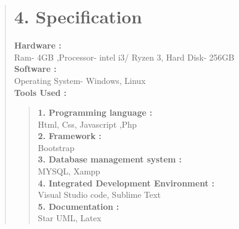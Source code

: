 \documentclass[12pt]{report}
\begin{document}
	
	\begin{quote}
		\section{4. Specification}
		\textbf{Hardware : }\\
		Ram- 4GB ,Processor- intel i3/ Ryzen 3, Hard Disk- 256GB\\
		\vspace{0.3cm}
		\textbf{Software : }\\
		Operating System- Windows, Linux\\
		\vspace{0.3cm}
		\textbf{Tools Used : }\\
		\begin{quote}
			\textbf{1. Programming language :}\\Html, Css, Javascript ,Php\\
			\vspace{0.2cm}
			\textbf{2. Framework :}\\Bootstrap\\
			\vspace{0.2cm}
			\textbf{3. Database management system :}\\MYSQL, Xampp\\
			\vspace{0.2cm}
			\textbf{4. Integrated Development Environment :}\\Visual Studio code, Sublime Text\\
			\vspace{0.2cm}
			\textbf{5. Documentation :}\\Star UML, Latex\\
		\end{quote}
	\end{quote}
	\clearpage
	
\end{document}
